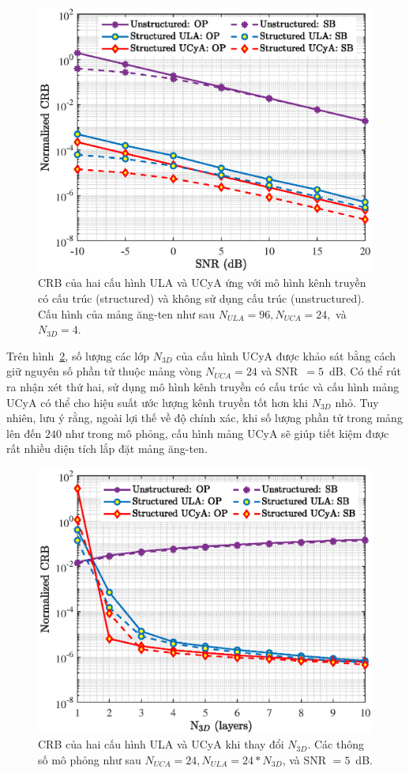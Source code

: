 \begin{figure}[ht]
    \centering
    \includegraphics[width=.7\linewidth]{figures/fig_1_3.eps}
    \caption{CRB của hai cấu hình ULA và UCyA ứng với mô hình kênh truyền có cấu trúc (structured) và không sử dụng cấu trúc (unstructured). Cấu hình của mảng ăng-ten như sau $N_{ULA} = 96, N_{UCA} = 24,$ và $N_{3D} = 4$.}
    \label{fig:op}
\end{figure}

Trên hình~\ref{fig:op_N3D}, số lượng các lớp $N_{3D}$ của cấu hình UCyA được khảo sát bằng cách giữ nguyên số phần tử thuộc mảng vòng $N_{UCA} = 24$ và SNR~$=5$~dB. Có thể rút ra nhận xét thứ hai, sử dụng mô hình kênh truyền có cấu trúc và cấu hình mảng UCyA có thể cho hiệu suất ước lượng kênh truyền tốt hơn khi $N_{3D}$ nhỏ. Tuy nhiên, lưu ý rằng, ngoài lợi thế về độ chính xác, khi số lượng phần tử trong mảng lên đến $240$ như trong mô phỏng, cấu hình mảng UCyA sẽ giúp tiết kiệm được rất nhiều diện tích lắp đặt mảng ăng-ten.
\begin{figure}[H]
    \centering
    \includegraphics[width=.7\linewidth]{figures/fig_2_3.eps}
    \caption{CRB của hai cấu hình ULA và UCyA khi thay đổi $N_{3D}$. Các thông số mô phỏng như sau $N_{UCA} = 24, N_{ULA} = 24 * N_{3D}$, và SNR $=5$~dB.}
    \label{fig:op_N3D}
\end{figure}

